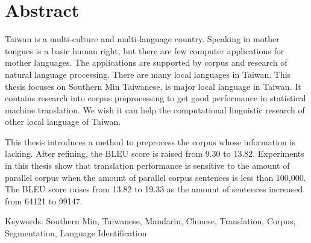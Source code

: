 \chapter{Abstract}
Taiwan is a multi-culture and multi-language country.
Speaking in mother tongues is a basic human right,
but there are few computer applications for mother languages.
The applications are supported by corpus and research of natural language processing.
There are many local languages in Taiwan.
This thesis focuses on Southern Min Taiwanese, is major local language in Taiwan.
It contains research into corpus preprocessing to get good performance in statistical machine translation.
We wish it can help the computational linguistic research of other local language of Taiwan.

This thesis introduces a method to preprocess the corpus whose information is lacking.
After refining,
the BLEU score is raised from 9.30 to 13.82.
Experiments in this thesis show that
translation performance is sensitive to the amount of parallel corpus
when the amount of parallel corpus sentences is less than 100,000.
The BLEU score raises from 13.82 to 19.33 as the amount of sentences increased from 64121 to 99147.

Keywords: Southern Min, Taiwanese, Mandarin, Chinese, Translation, Corpus, Segmentation, Language Identification